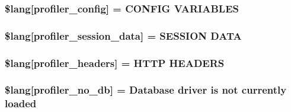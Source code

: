 \subsubsection[{\$lang}]{\setlength{\rightskip}{0pt plus 5cm}\$lang\mbox{[}\textquotesingle{}profiler\+\_\+config\textquotesingle{}\mbox{]} = \textquotesingle{}C\+O\+N\+F\+I\+G V\+A\+R\+I\+A\+B\+L\+E\+S\textquotesingle{}}\label{profiler__lang_8php_a68a43f2ac48abfc21cd12ee19e75e421}
\hypertarget{profiler__lang_8php_a6caa2b856b3211345f4a916febd79a84}{}
\subsubsection[{\$lang}]{\setlength{\rightskip}{0pt plus 5cm}\$lang\mbox{[}\textquotesingle{}profiler\+\_\+session\+\_\+data\textquotesingle{}\mbox{]} = \textquotesingle{}S\+E\+S\+S\+I\+O\+N D\+A\+T\+A\textquotesingle{}}\label{profiler__lang_8php_a6caa2b856b3211345f4a916febd79a84}
\hypertarget{profiler__lang_8php_a079eb6971dec0c6115344e4b621e235f}{}
\subsubsection[{\$lang}]{\setlength{\rightskip}{0pt plus 5cm}\$lang\mbox{[}\textquotesingle{}profiler\+\_\+headers\textquotesingle{}\mbox{]} = \textquotesingle{}H\+T\+T\+P H\+E\+A\+D\+E\+R\+S\textquotesingle{}}\label{profiler__lang_8php_a079eb6971dec0c6115344e4b621e235f}
\hypertarget{profiler__lang_8php_a74da0e429477e757130da70e135d4ae9}{}
\subsubsection[{\$lang}]{\setlength{\rightskip}{0pt plus 5cm}\$lang\mbox{[}\textquotesingle{}profiler\+\_\+no\+\_\+db\textquotesingle{}\mbox{]} = \textquotesingle{}Database driver is not currently loaded\textquotesingle{}}\label{profiler__lang_8php_a74da0e429477e757130da70e135d4ae9}
\hypertarget{profiler__lang_8php_a783abf2a3410bbc9c32e4b7bb774724b}{}
